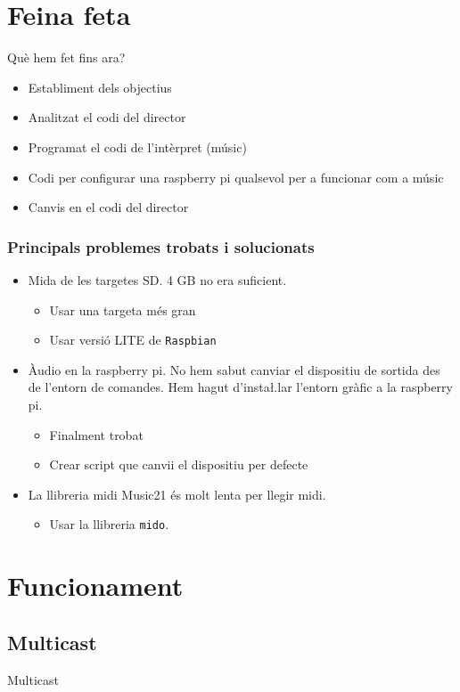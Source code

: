 \documentclass{beamer}
\begin{document}
\section{Feina feta}
\begin{frame}{Què hem fet fins ara?}
	\begin{itemize}
		\item Establiment dels objectius
		\item Analitzat el codi del director
		\item Programat el codi de l'intèrpret (músic)
		\item Codi per configurar una raspberry pi qualsevol per a funcionar com a músic
		\item Canvis en el codi del director
	\end{itemize}
\end{frame}

\begin{frame}
	\frametitle{Principals problemes trobats i solucionats}
	\begin{itemize}[<+->]
		\item Mida de les targetes SD. 4 GB no era suficient.
		\begin{itemize}
			\item Usar una targeta més gran
			\item Usar versió LITE de \texttt{Raspbian}
		\end{itemize}
		\item Àudio en la raspberry pi. No hem sabut canviar el dispositiu de sortida des de l'entorn de comandes. Hem hagut d'insta\l.lar l'entorn gràfic a la raspberry pi.
		\begin{itemize}
			\item Finalment trobat
			\item Crear script que canvii el dispositiu per defecte
		\end{itemize}
		\item La llibreria midi Music21 és molt lenta per llegir midi.
		\begin{itemize}
			\item Usar la llibreria \texttt{mido}.
		\end{itemize}
	\end{itemize}
\end{frame}

\section{Funcionament}
\subsection{Multicast}
\begin{frame}{Multicast}
	
\end{frame}
\end{document}
